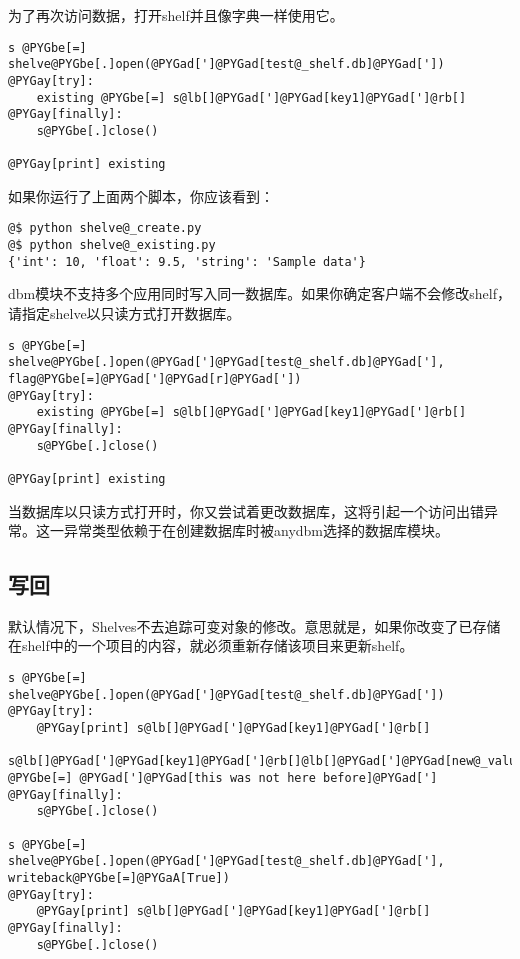 \documentclass[a4paper,10pt,english]{manual}
\begin{document}
为了再次访问数据，打开shelf并且像字典一样使用它。

\begin{Verbatim}[commandchars=@\[\]]
s @PYGbe[=] shelve@PYGbe[.]open(@PYGad[']@PYGad[test@_shelf.db]@PYGad['])
@PYGay[try]:
    existing @PYGbe[=] s@lb[]@PYGad[']@PYGad[key1]@PYGad[']@rb[]
@PYGay[finally]:
    s@PYGbe[.]close()

@PYGay[print] existing
\end{Verbatim}

如果你运行了上面两个脚本，你应该看到：

\begin{Verbatim}[commandchars=@\[\]]
@$ python shelve@_create.py
@$ python shelve@_existing.py
{'int': 10, 'float': 9.5, 'string': 'Sample data'}
\end{Verbatim}

dbm模块不支持多个应用同时写入同一数据库。如果你确定客户端不会修改shelf， 请指定shelve以只读方式打开数据库。

\begin{Verbatim}[commandchars=@\[\]]
s @PYGbe[=] shelve@PYGbe[.]open(@PYGad[']@PYGad[test@_shelf.db]@PYGad['], flag@PYGbe[=]@PYGad[']@PYGad[r]@PYGad['])
@PYGay[try]:
    existing @PYGbe[=] s@lb[]@PYGad[']@PYGad[key1]@PYGad[']@rb[]
@PYGay[finally]:
    s@PYGbe[.]close()

@PYGay[print] existing
\end{Verbatim}

当数据库以只读方式打开时，你又尝试着更改数据库，这将引起一个访问出错异常。这一异常类型依赖于在创建数据库时被anydbm选择的数据库模块。


\subsection{写回}

默认情况下，Shelves不去追踪可变对象的修改。意思就是，如果你改变了已存储在shelf中的一个项目的内容，就必须重新存储该项目来更新shelf。

\begin{Verbatim}[commandchars=@\[\]]
s @PYGbe[=] shelve@PYGbe[.]open(@PYGad[']@PYGad[test@_shelf.db]@PYGad['])
@PYGay[try]:
    @PYGay[print] s@lb[]@PYGad[']@PYGad[key1]@PYGad[']@rb[]
    s@lb[]@PYGad[']@PYGad[key1]@PYGad[']@rb[]@lb[]@PYGad[']@PYGad[new@_value]@PYGad[']@rb[] @PYGbe[=] @PYGad[']@PYGad[this was not here before]@PYGad[']
@PYGay[finally]:
    s@PYGbe[.]close()

s @PYGbe[=] shelve@PYGbe[.]open(@PYGad[']@PYGad[test@_shelf.db]@PYGad['], writeback@PYGbe[=]@PYGaA[True])
@PYGay[try]:
    @PYGay[print] s@lb[]@PYGad[']@PYGad[key1]@PYGad[']@rb[]
@PYGay[finally]:
    s@PYGbe[.]close()
\end{Verbatim}
\end{document}

